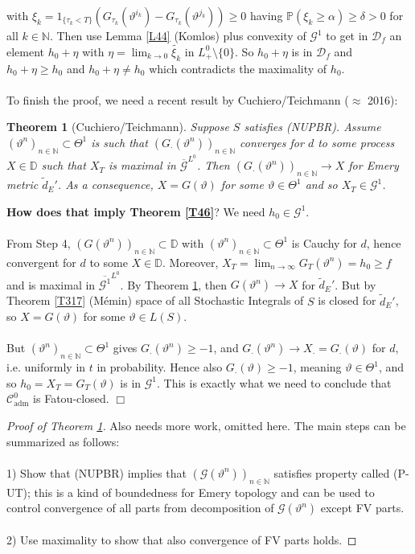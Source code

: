 \documentclass[12pt,a4paper, twoside]{article}
\newtheorem{thm}{Theorem}[section]
\theoremstyle{definition}
\newcommand{\PP}{\mathbb{P}} %
\begin{document}
 with $\xi_k = 1_{\{ \tau_k < T\}} ( G_{\tau_k} ( \vartheta^{i_k}) - G_{\tau_k} ( \vartheta^{j_k})) \geq 0$ having $\PP( \xi_k \geq \alpha) \geq \delta > 0$ for all $k \in \mathbb{N}$. Then use Lemma \ref{L44} (Komlos) plus convexity of $\mathcal{G}^1$ to get in $\mathcal{D}_f$ an element $h_0 + \eta$ with $\eta = \lim_{k \to 0} \widetilde{ \xi_k}$ in $L_+^0 \setminus \{0\}$. So $h_0 + \eta$ is in $\mathcal{D}_f$ and $h_0 + \eta \geq h_0$ and $h_0 + \eta \neq h_0$ which contradicts the maximality of $h_0$. 
 \\\\
 To finish the proof, we need a recent result by Cuchiero/Teichmann ($\approx$ 2016):
\begin{thm}[Cuchiero/Teichmann] \label{T47} Suppose $S$ satisfies (NUPBR). Assume $( \vartheta^n)_{n \in \mathbb{N}} \subset \Theta^1$ is such that $(G_\cdot ( \vartheta^n))_{n \in \mathbb{N}}$ converges for $d$ to some process $X \in \mathbb{D}$ such that $X_T$ is maximal in $\overline{\mathcal{G}}^{L^0}$. Then $(G_\cdot ( \vartheta^n))_{n \in \mathbb{N}} \to X$ for Emery metric $\widetilde{d}_E'$. As a consequence, $X= G( \vartheta)$ for some $\vartheta \in \Theta^1$ and so $X_T \in \mathcal{G}^1$. 
\end{thm}
\noindent \textbf{How does that imply Theorem \ref{T46}}? We need $h_0 \in \mathcal{G}^1$.\\
\\
From Step 4, $(G( \vartheta^n))_{n \in \mathbb{N}} \subset \mathbb{D}$ with $( \vartheta^n)_{n \in \mathbb{N}} \subset \Theta^1$ is Cauchy for $d$, hence convergent for $d$ to some $X \in \mathbb{D}$. Moreover,  $ X_T= \lim_{n \to \infty} G_T( \vartheta^n)=h_0 \geq f$ and is maximal in $\overline{\mathcal{G}^1}^{L^0}$. By Theorem \ref{T47}, then $G( \vartheta^n) \to X$ for $\widetilde{d}_E'$. But by Theorem \ref{T317} (Mémin) space of all Stochastic Integrals of $S$ is closed for $\widetilde{d}_E'$, so $X=G ( \vartheta)$ for some $\vartheta \in L(S)$. 
\\\\
But $( \vartheta^n)_{n \in \mathbb{N}} \subset \Theta^1$ gives $G_\cdot ( \vartheta^n) \geq -1$, and $G_\cdot ( \vartheta^n) \to X_\cdot = G_\cdot ( \vartheta)$ for $d$, i.e. uniformly in $t$ in probability. Hence also $G_\cdot ( \vartheta) \geq -1$, meaning $\vartheta \in \Theta^1$, and so $h_0 = X_T = G_T( \vartheta)$ is in $\mathcal{G}^1$. This is exactly what we need to conclude that $\mathcal{C}_\text{adm}^0$ is Fatou-closed. \hfill $\Box$
\begin{proof}[Proof of Theorem \ref{T47}] Also needs more work, omitted here. The main steps can be summarized as follows:
\\\\
1) Show that (NUPBR) implies that $( \mathcal{G}( \vartheta^n))_{n \in \mathbb{N}}$ satisfies property called (P-UT); this is a kind of boundedness for Emery topology and can be used to control convergence of all parts from decomposition of $\mathcal{G}( \vartheta^n)$ except FV parts.
\\\\
2) Use maximality to show that also convergence of FV parts holds. 
\end{proof}
\newpage
\end{document}
